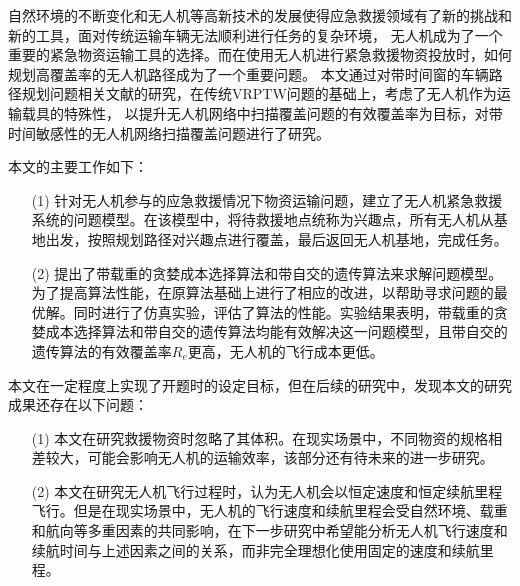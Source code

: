 
\begin{conclusions}
自然环境的不断变化和无人机等高新技术的发展使得应急救援领域有了新的挑战和新的工具，面对传统运输车辆无法顺利进行任务的复杂环境，
无人机成为了一个重要的紧急物资运输工具的选择。而在使用无人机进行紧急救援物资投放时，如何规划高覆盖率的无人机路径成为了一个重要问题。
本文通过对带时间窗的车辆路径规划问题相关文献的研究，在传统VRPTW问题的基础上，考虑了无人机作为运输载具的特殊性，
以提升无人机网络中扫描覆盖问题的有效覆盖率为目标，对带时间敏感性的无人机网络扫描覆盖问题进行了研究。


本文的主要工作如下：
\begin{itemize}
	\item [(1)] 针对无人机参与的应急救援情况下物资运输问题，建立了无人机紧急救援系统的问题模型。在该模型中，将待救援地点统称为兴趣点，所有无人机从基地出发，按照规划路径对兴趣点进行覆盖，最后返回无人机基地，完成任务。
 	\item [(2)] 提出了带载重的贪婪成本选择算法和带自交的遗传算法来求解问题模型。为了提高算法性能，在原算法基础上进行了相应的改进，以帮助寻求问题的最优解。同时进行了仿真实验，评估了算法的性能。实验结果表明，带载重的贪婪成本选择算法和带自交的遗传算法均能有效解决这一问题模型，且带自交的遗传算法的有效覆盖率$R_e$更高，无人机的飞行成本更低。
\end{itemize}


本文在一定程度上实现了开题时的设定目标，但在后续的研究中，发现本文的研究成果还存在以下问题：
\begin{itemize}
	\item [(1)] 本文在研究救援物资时忽略了其体积。在现实场景中，不同物资的规格相差较大，可能会影响无人机的运输效率，该部分还有待未来的进一步研究。
 	\item [(2)] 本文在研究无人机飞行过程时，认为无人机会以恒定速度和恒定续航里程飞行。但是在现实场景中，无人机的飞行速度和续航里程会受自然环境、载重和航向等多重因素的共同影响，在下一步研究中希望能分析无人机飞行速度和续航时间与上述因素之间的关系，而非完全理想化使用固定的速度和续航里程。
\end{itemize}

\end{conclusions}